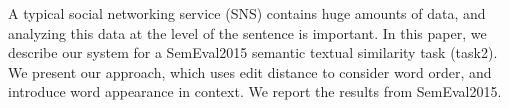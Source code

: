 A typical social networking service (SNS) contains huge amounts of data, and analyzing this data at the level of the sentence is important. In this paper, we describe our system for a SemEval2015 semantic textual similarity task (task2). We present our approach, which uses edit distance to consider word order, and introduce word appearance in context. We report the results from SemEval2015.
